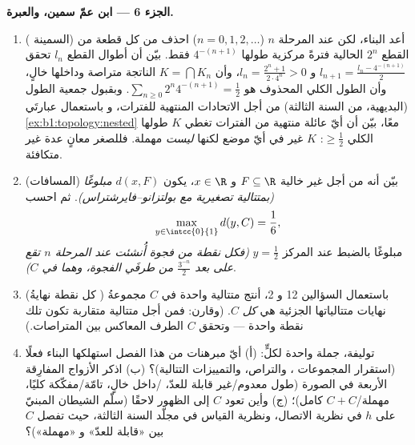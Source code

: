 \begin{problem}[{مسألة نهاية الأسبوع --- \omterm{pb:b1:topology:1}{مجموعة كانتور} ذات الأثلاث
الوسطى: طولها معدوم، وغير قابلة للعدّ، وتامّة، و $C + C =
\intcc{0}{2}$}]
\medskip
\noindent\textbf{الجزء 6 --- ابن عمّ سمين، والعبرة.}
\begin{enumerate}[resume]
  \item ( السمينة) أعد البناء، لكن عند المرحلة
        $n$ ($n = 0, 1, 2, \dots$) احذف من كل قطعة من القطع $2^n$
        الحالية فترةً  مركزية طولها
        $4^{-(n+1)}$ فقط. بيّن أن أطوال القطع $l_n$
        تحقق $l_{n+1} = \frac{l_n - 4^{-(n+1)}}{2}$ و $l_n =
        \frac{2^n + 1}{2\cdot 4^n} > 0$، وأن
        $K = \bigcap K_n$ الناتجة متراصة وداخلها خالٍ، وأن
        الطول الكلي المحذوف هو $\sum_{n\geq0} 2^n
        4^{-(n+1)} = \frac12$. وبقبول جمعية الطول (البديهية، من السنة الثالثة)
        من أجل الاتحادات المنتهية للفترات، و
        باستعمال عبارتَي \cref{ex:b1:topology:nested} معًا،
        بيّن أن أيّ عائلة منتهية من الفترات  تغطي
        $K$ طولها الكلي $\geq \frac12$:  $K$ غير  في
        أيّ موضع لكنها \emph{ليست} مهملة. فللصغر معانٍ عدة
        غير متكافئة.
  \item (المسافات) بيّن أنه من أجل  غير خالية $F \subseteq
        \R$ و $x \in \R$، يكون  $d(x, F)$
        \emph{مبلوغًا} \emph{(بمتتالية تصغيرية مع
        بولتزانو--فايرشتراس)}. ثم احسب
        \[
        \max_{y \in \intcc{0}{1}} d(y, C) = \frac16 ,
        \]
        مبلوغًا بالضبط عند المركز $y = \frac12$ \emph{(فكل
        نقطة من فجوة أُنشئت عند المرحلة $n$ تقع على بعد
        $\frac{3^{-n}}{2}$ من طرفَي الفجوة، وهما في
        $C$)}.
  \item (كل نقطة نهايةُ ) باستعمال السؤالين 12
        و 2، أنتج متتالية واحدة في $C$ مجموعةُ
        نهايات متتالياتها الجزئية هي \emph{كل} $C$. (وقارن:
        فمن أجل متتالية متقاربة تكون تلك  نقطة واحدة ---
        وتحقق $C$ الطرف المعاكس بين المتراصات.)
  \item توليفة، جملة واحدة لكلٍّ: (أ) أيّ مبرهنات من هذا
        الفصل استهلكها البناء فعلًا (استقرار
        المجموعات ، والتراص، والتمييزات
        التتالية)؟ (ب) اذكر الأزواج المفارِقة الأربعة
        في الصورة (طول معدوم/غير قابلة للعدّ،
        /داخل خالٍ، تامّة/مفكّكة كليًا،
        مهملة/$C+C$ كامل)؛ (ج) وأين تعود $C$ إلى الظهور
        لاحقًا (سلّم الشيطان المبنيّ على $h$ في نظرية
        الاتصال، ونظرية القياس في مجلّد السنة الثالثة،
        حيث تفصل $C$ بين «قابلة للعدّ» و
        «مهملة»)؟
\end{enumerate}
\end{problem}
